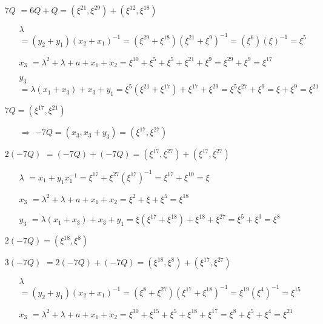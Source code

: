 \documentclass[fleqn]{article}
\begin{document}
    \begin{itemize}
        \item[$7Q$] $ = 6Q + Q = (\xi^{21}, \xi^{29}) + (\xi^{12}, \xi^{18})$
            \begin{itemize}
                \item[$\lambda$] $ = (y_2 + y_1)(x_2 + x_1)^{-1} = (\xi^{29} + \xi^{18})(\xi^{21} + \xi^{9})^{-1} = (\xi^{6})(\xi)^{-1} = \xi^{5}$
                \item[$x_3$] $ = \lambda^2 + \lambda + a + x_1 + x_2 = \xi^{10} + \xi^{5} + \xi^{5} + \xi^{21} + \xi^{9} = \xi^{29} + \xi^{9} = \xi^{17}$
                \item[$y_3$] $ = \lambda(x_1 + x_3) + x_3 + y_1 = \xi^{5} (\xi^{21} + \xi^{17}) + \xi^{17} + \xi^{29} = \xi^{5} \xi^{27} + \xi^{9} = \xi + \xi^{9} = \xi^{21}$
            \end{itemize}
            $7Q = (\xi^{17}, \xi^{21})$
            \begin{itemize}
                \item[$\Rightarrow$] $-7Q = (x_3, x_3 + y_3) = (\xi^{17}, \xi^{27})$
            \end{itemize}
        \item[$2(-7Q)$] $ = (-7Q) + (-7Q) = (\xi^{17}, \xi^{27}) + (\xi^{17}, \xi^{27})$
            \begin{itemize}
                \item[$\lambda$] $ = x_1 + y_1x_1^{-1} = \xi^{17} + \xi^{27} (\xi^{17})^{-1} = \xi^{17} + \xi^{10} = \xi$
                \item[$x_3$] $ = \lambda^2 + \lambda + a + x_1 + x_2 = \xi^{2} + \xi + \xi^{5} = \xi^{18}$
                \item[$y_3$] $ = \lambda(x_1 + x_3) + x_3 + y_1 = \xi (\xi^{17} + \xi^{18}) + \xi^{18} + \xi^{27} = \xi^{5} + \xi^{3} = \xi^{8}$
            \end{itemize}
            $2(-7Q) = (\xi^{18}, \xi^{8})$
        \item[$3(-7Q)$] $ = 2(-7Q) + (-7Q) = (\xi^{18}, \xi^{8}) + (\xi^{17}, \xi^{27})$
            \begin{itemize}
                \item[$\lambda$] $ = (y_2 + y_1)(x_2 + x_1)^{-1} = (\xi^{8} + \xi^{27}) (\xi^{17} + \xi^{18})^{-1} = \xi^{19} (\xi^{4})^{-1} = \xi^{15}$
                \item[$x_3$] $ = \lambda^2 + \lambda + a + x_1 + x_2 = \xi^{30} + \xi^{15} + \xi^{5} + \xi^{18} + \xi^{17} = \xi^{8} + \xi^{5} + \xi^{4} = \xi^{21}$

\end{itemize}
\end{itemize}
\end{document}
